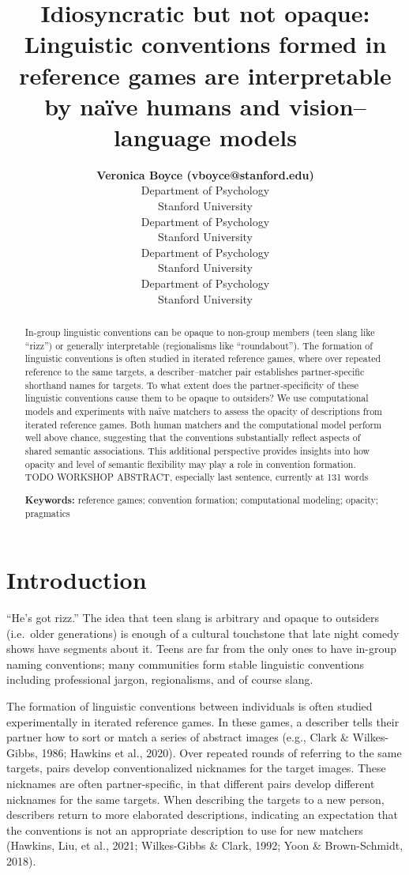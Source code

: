 \documentclass[10pt, letterpaper]{article}
\title{Idiosyncratic but not opaque: Linguistic conventions formed in
reference games are interpretable by naïve humans and vision--language
models}
\author{{\large \bf Veronica Boyce (vboyce@stanford.edu)} \\ Department of Psychology \\ Stanford University \And {\large \bf Ben Prystawski (benpry@stanford.edu)} \\Department of Psychology \\ Stanford University \AND {\large \bf Alvin Wei Ming Tan (tanawm@stanford.edu)} \\ Department of Psychology \\ Stanford University \And {\large \bf Michael C. Frank (mcfrank@stanford.edu)} \\ Department of Psychology \\ Stanford University}
\begin{document}
\maketitle

\begin{abstract}
In-group linguistic conventions can be opaque to non-group members (teen
slang like ``rizz'') or generally interpretable (regionalisms like
``roundabout''). The formation of linguistic conventions is often
studied in iterated reference games, where over repeated reference to
the same targets, a describer--matcher pair establishes partner-specific
shorthand names for targets. To what extent does the partner-specificity
of these linguistic conventions cause them to be opaque to outsiders? We
use computational models and experiments with naïve matchers to assess
the opacity of descriptions from iterated reference games. Both human
matchers and the computational model perform well above chance,
suggesting that the conventions substantially reflect aspects of shared
semantic associations. This additional perspective provides insights
into how opacity and level of semantic flexibility may play a role in
convention formation. TODO WORKSHOP ABSTRACT, especially last sentence,
currently at 131 words

\textbf{Keywords:}
reference games; convention formation; computational modeling; opacity;
pragmatics
\end{abstract}

\section{Introduction}\label{introduction}

``He's got rizz.'' The idea that teen slang is arbitrary and opaque to
outsiders (i.e.~older generations) is enough of a cultural touchstone
that late night comedy shows have segments about it. Teens are far from
the only ones to have in-group naming conventions; many communities form
stable linguistic conventions including professional jargon,
regionalisms, and of course slang.

The formation of linguistic conventions between individuals is often
studied experimentally in iterated reference games. In these games, a
describer tells their partner how to sort or match a series of abstract
images (e.g., Clark \& Wilkes-Gibbs, 1986; Hawkins et al., 2020). Over
repeated rounds of referring to the same targets, pairs develop
conventionalized nicknames for the target images. These nicknames are
often partner-specific, in that different pairs develop different
nicknames for the same targets. When describing the targets to a new
person, describers return to more elaborated descriptions, indicating an
expectation that the conventions is not an appropriate description to
use for new matchers (Hawkins, Liu, et al., 2021; Wilkes-Gibbs \& Clark,
1992; Yoon \& Brown-Schmidt, 2018).
\end{document}

